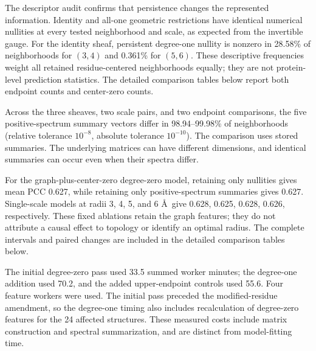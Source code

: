 \begin{samepage}
The descriptor audit confirms that persistence changes the represented information. Identity and all-one geometric restrictions have identical numerical nullities at every tested neighborhood and scale, as expected from the invertible gauge. For the identity sheaf, persistent degree-one nullity is nonzero in 28.58\% of neighborhoods for $(3,4)$ and 0.361\% for $(5,6)$. These descriptive frequencies weight all retained residue-centered neighborhoods equally; they are not protein-level prediction statistics. The detailed comparison tables below report both endpoint counts and center-zero counts.
\par\end{samepage}

Across the three sheaves, two scale pairs, and two endpoint comparisons, the five positive-spectrum summary vectors differ in 98.94--99.98\% of neighborhoods (relative tolerance $10^{-8}$, absolute tolerance $10^{-10}$). The comparison uses stored summaries. The underlying matrices can have different dimensions, and identical summaries can occur even when their spectra differ.

For the graph-plus-center-zero degree-zero model, retaining only nullities gives mean PCC 0.627, while retaining only positive-spectrum summaries gives 0.627. Single-scale models at radii 3, 4, 5, and 6 \AA\ give 0.628, 0.625, 0.628, 0.626, respectively. These fixed ablations retain the graph features; they do not attribute a causal effect to topology or identify an optimal radius. The complete intervals and paired changes are included in the detailed comparison tables below.

The initial degree-zero pass used 33.5 summed worker minutes; the degree-one addition used 70.2, and the added upper-endpoint controls used 55.6. Four feature workers were used. The initial pass preceded the modified-residue amendment, so the degree-one timing also includes recalculation of degree-zero features for the 24 affected structures. These measured costs include matrix construction and spectral summarization, and are distinct from model-fitting time.

